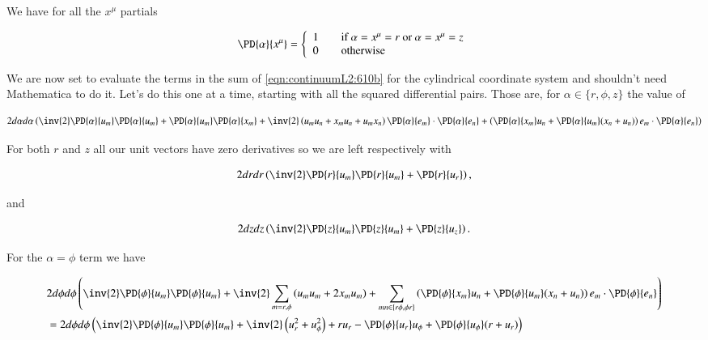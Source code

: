 We have for all the $x^\mu$ partials

\begin{equation}\label{eqn:continuumL2:710}
\PD{\alpha}{x^\mu} = 
\left\{
\begin{array}{l l}
1 & \quad \mbox{if $\alpha = x^\mu = r$ or $\alpha = x^\mu = z$} \\
0 & \quad \mbox{otherwise}
\end{array}
\right.
\end{equation}

We are now set to evaluate the terms in the sum of \ref{eqn:continuumL2:610b} for the cylindrical coordinate system and shouldn't need Mathematica to do it.  Let's do this one at a time, starting with all the squared differential pairs.  Those are, for $\alpha \in \{r, \phi, z\}$ the value of

\begin{equation}\label{eqn:continuumL2:n}
2 d\alpha d\alpha 
\left( 
\inv{2}
\PD{\alpha}{u_m} 
\PD{\alpha}{u_m} 
+
\PD{\alpha}{u_m} 
\PD{\alpha}{x_m} 
+ 
\inv{2}
\left(
u_m u_n 
+
x_m u_n 
+
u_m x_n 
\right)
\PD{\alpha}{e_m}
\cdot
\PD{\alpha}{e_n} 
+
\left(
\PD{\alpha}{x_m}
u_n
+
\PD{\alpha}{u_m}(
x_n
+
u_n
)
\right)
e_m \cdot 
\PD{\alpha}{e_n}
\right)
\end{equation}

For both $r$ and $z$ all our unit vectors have zero derivatives so we are left respectively with

\begin{equation}\label{eqn:continuumL2:n}
2 dr dr 
\left( 
\inv{2}
\PD{r}{u_m} 
\PD{r}{u_m} 
+
\PD{r}{u_r} 
\right),
\end{equation}

and

\begin{equation}\label{eqn:continuumL2:n}
2 dz dz 
\left( 
\inv{2}
\PD{z}{u_m} 
\PD{z}{u_m} 
+
\PD{z}{u_z} 
\right).
\end{equation}

For the $\alpha = \phi$ term we have

\begin{align*}
&2 d\phi d\phi 
\left( 
\inv{2}
\PD{\phi}{u_m} 
\PD{\phi}{u_m} 
+ 
\inv{2}
\sum_{m = r, \phi}
\left(
u_m u_m 
+
2 x_m u_m 
\right)
+
\sum_{m n \in \{r \phi, \phi r\}}
\left(
\PD{\phi}{x_m}
u_n
+
\PD{\phi}{u_m}(
x_n
+
u_n
)
\right)
e_m \cdot 
\PD{\phi}{e_n}
\right) \\
&=
2 d\phi d\phi 
\left( 
\inv{2}
\PD{\phi}{u_m} 
\PD{\phi}{u_m} 
+ 
\inv{2} \left( u_r^2 + u_\phi^2 \right) + r u_r
-
\PD{\phi}{u_r}
u_\phi
+
\PD{\phi}{u_\phi}(
r
+
u_r
)
\right)
\end{align*}

